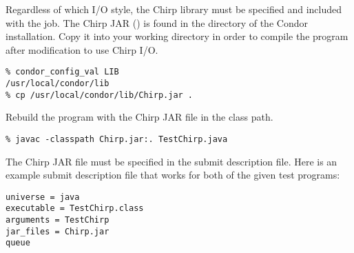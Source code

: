 Regardless of which I/O style, 
the Chirp library must be specified and included with the job.
The Chirp JAR ()
is found in the  directory of the Condor installation.
Copy it into your working directory in order to
compile the program after modification to use Chirp I/O.

\begin{verbatim}
% condor_config_val LIB
/usr/local/condor/lib
% cp /usr/local/condor/lib/Chirp.jar .
\end{verbatim}

Rebuild the program with the Chirp JAR file in the class path.

\begin{verbatim}
% javac -classpath Chirp.jar:. TestChirp.java
\end{verbatim}

The Chirp JAR file must be specified in the submit description file.
Here is an example submit description file that works for both
of the given test programs:

\begin{verbatim}
universe = java
executable = TestChirp.class
arguments = TestChirp
jar_files = Chirp.jar
queue
\end{verbatim}
